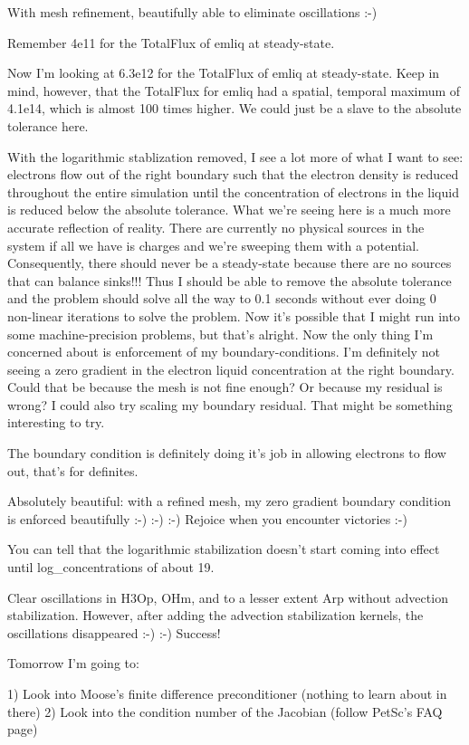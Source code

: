 {With mesh refinement, beautifully able to eliminate oscillations :-)

Remember 4e11 for the TotalFlux of emliq at steady-state.

Now I'm looking at 6.3e12 for the TotalFlux of emliq at steady-state. Keep in mind, however, that the TotalFlux for emliq had a spatial, temporal maximum of 4.1e14, which is almost 100 times higher. We could just be a slave to the absolute tolerance here.

With the logarithmic stablization removed, I see a lot more of what I want to see: electrons flow out of the right boundary such that the electron density is reduced throughout the entire simulation until the concentration of electrons in the liquid is reduced below the absolute tolerance. What we're seeing here is a much more accurate reflection of reality. There are currently no physical sources in the system if all we have is charges and we're sweeping them with a potential. Consequently, there should never be a steady-state because there are no sources that can balance sinks!!! Thus I should be able to remove the absolute tolerance and the problem should solve all the way to 0.1 seconds without ever doing 0 non-linear iterations to solve the problem. Now it's possible that I might run into some machine-precision problems, but that's alright. Now the only thing I'm concerned about is enforcement of my boundary-conditions. I'm definitely not seeing a zero gradient in the electron liquid concentration at the right boundary. Could that be because the mesh is not fine enough? Or because my residual is wrong? I could also try scaling my boundary residual. That might be something interesting to try.

The boundary condition is definitely doing it's job in allowing electrons to flow out, that's for definites.

Absolutely beautiful: with a refined mesh, my zero gradient boundary condition is enforced beautifully :-) :-) :-) Rejoice when you encounter victories :-)

You can tell that the logarithmic stabilization doesn't start coming into effect until log_concentrations of about 19.

Clear oscillations in H3Op, OHm, and to a lesser extent Arp without advection stabilization. However, after adding the advection stabilization kernels, the oscillations disappeared :-) :-) Success!

Tomorrow I'm going to:

1) Look into Moose's finite difference preconditioner (nothing to learn about in there)
2) Look into the condition number of the Jacobian (follow PetSc's FAQ page)

}
